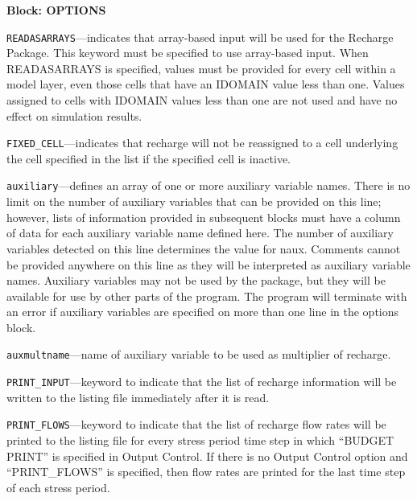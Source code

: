 
\item \textbf{Block: OPTIONS}

\begin{description}
\item \texttt{READASARRAYS}---indicates that array-based input will be used for the Recharge Package.  This keyword must be specified to use array-based input.  When READASARRAYS is specified, values must be provided for every cell within a model layer, even those cells that have an IDOMAIN value less than one.  Values assigned to cells with IDOMAIN values less than one are not used and have no effect on simulation results.

\item \texttt{FIXED\_CELL}---indicates that recharge will not be reassigned to a cell underlying the cell specified in the list if the specified cell is inactive.

\item \texttt{auxiliary}---defines an array of one or more auxiliary variable names.  There is no limit on the number of auxiliary variables that can be provided on this line; however, lists of information provided in subsequent blocks must have a column of data for each auxiliary variable name defined here.   The number of auxiliary variables detected on this line determines the value for naux.  Comments cannot be provided anywhere on this line as they will be interpreted as auxiliary variable names.  Auxiliary variables may not be used by the package, but they will be available for use by other parts of the program.  The program will terminate with an error if auxiliary variables are specified on more than one line in the options block.

\item \texttt{auxmultname}---name of auxiliary variable to be used as multiplier of recharge.

\item \texttt{PRINT\_INPUT}---keyword to indicate that the list of recharge information will be written to the listing file immediately after it is read.

\item \texttt{PRINT\_FLOWS}---keyword to indicate that the list of recharge flow rates will be printed to the listing file for every stress period time step in which ``BUDGET PRINT'' is specified in Output Control.  If there is no Output Control option and ``PRINT\_FLOWS'' is specified, then flow rates are printed for the last time step of each stress period.


\end{description}
